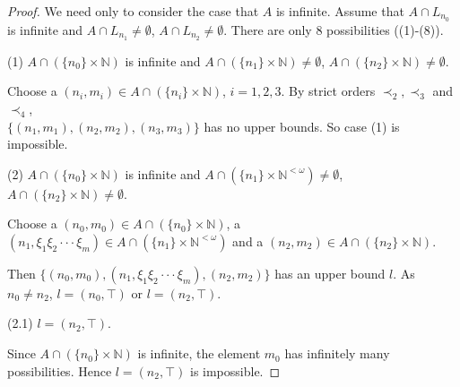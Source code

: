 \documentclass[10pt,a4paper]{amsart}
\begin{document}
\begin{proof}We need only to consider the case that $A$ is infinite. Assume that $A\cap L_{n_{0}}$ is infinite and $A\cap L_{n_{1}}\neq\emptyset$, $A\cap L_{n_{2}}\neq\emptyset$. There are only 8 possibilities ((1)-(8)).

(1) $A\cap(\{n_{0}\}\times\mathbb{N})$ is infinite and $A\cap(\{n_{1}\}\times\mathbb{N})\neq\emptyset$, $A\cap(\{n_{2}\}\times\mathbb{N})\neq\emptyset$.

Choose a $(n_{i},m_{i})\in A\cap(\{n_{i}\}\times\mathbb{N})$, $i=1,2,3$.  By strict orders $\prec_{2},\prec_{3} $ and $\prec_{4}$,\\ $\{(n_{1},m_{1}),(n_{2},m_{2}),(n_{3},m_{3})\}$ has no upper bounds. So case (1) is impossible.

(2) $A\cap(\{n_{0}\}\times\mathbb{N})$ is infinite and $A\cap(\{n_{1}\}\times\mathbb{N}^{<\omega})\neq\emptyset$, $A\cap(\{n_{2}\}\times\mathbb{N})\neq\emptyset$.

Choose a $(n_{0},m_{0})\in A\cap(\{n_{0}\}\times\mathbb{N})$, a $(n_{1},\xi_{1}\xi_{2}\cdot\cdot\cdot\xi_{m})\in A\cap(\{n_{1}\}\times\mathbb{N}^{<\omega})$ and a $(n_{2},m_{2})\in A\cap(\{n_{2}\}\times\mathbb{N})$.

Then $\{(n_{0},m_{0}),(n_{1},\xi_{1}\xi_{2}\cdot\cdot\cdot\xi_{m}),(n_{2},m_{2})\}$ has an upper bound $l$. As $n_{0}\neq n_{2}$, $l=(n_{0},\top)$ or $l=(n_{2},\top)$.



(2.1) $l=(n_{2},\top)$.

Since $A\cap(\{n_{0}\}\times\mathbb{N})$ is infinite, the element $m_{0}$ has infinitely many possibilities. Hence $l=(n_{2},\top)$ is impossible.






\end{proof}
\end{document}
